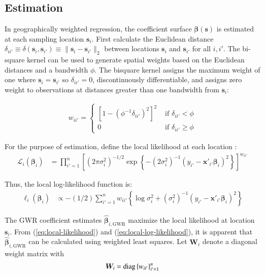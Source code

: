 \documentclass[authoryear, review, 11pt]{elsarticle}
\begin{document}
	\subsection{Estimation}		
	In geographically weighted regression, the coefficient surface $\bm{\beta}(\bm{s})$ is estimated at each sampling location $\bm{s}_i$. First calculate the Euclidean distance $\delta_{ii'} \equiv \delta\left(\bm{s}_i, \bm{s}_{i'}\right) \equiv \|\bm{s}_i  -\bm{s}_{i'}\|_2$ between locations $\bm{s}_i$ and $\bm{s}_{i'}$ for all $i, i'$. The bi-square kernel can be used to generate spatial weights based on the Euclidean distances and a bandwidth $\phi$. The bisquare kernel assigns the maximum weight of one where $\bm{s}_i = \bm{s}_{i'}$ so $\delta_{ii'}=0$, discontinuously differentiable, and assigns zero weight to observations at distances greater than one bandwidth from $\bm{s}_i$:
	
	\begin{align}\label{eq:bisquare}
		w_{ii'} = \begin{cases} \left[1-\left(\phi^{-1}\delta_{ii'}\right)^2\right]^2 &\mbox{ if } \delta_{ii'} < \phi \\ 0 &\mbox{ if } \delta_{ii'} \geq \phi \end{cases}
	\end{align}
	
	For the purpose of estimation, define the local likelihood at each location \citep{Fotheringham:2002}:
	\begin{align}\label{eq:local-likelihood}
		\mathcal{L}_i \left(\bm{\beta}_i \right) &= \prod_{i'=1}^n \left[ \left(2 \pi \sigma^2_i  \right)^{-1/2}  \exp\left\{-\left(2 \sigma^2_i\right)^{-1}  \left(y_{i'} - \bm{x}'_{i'} \bm{\beta}_i \right)^2 \right\} \right] ^ {w_{ii'}}
	\end{align}
			
	Thus, the local log-likelihood function is:
	\begin{align}\label{eq:local-log-likelihood}
		\ell_i\left(\bm{\beta}_i\right) &\propto -(1/2) \sum_{i'=1}^n w_{ii'} \left\{ \log{\sigma^2_i}  + \left(\sigma^2_i\right)^{-1}  \left(y_{i'} - \bm{x}'_{i'} \bm{\beta}_i \right)^2 \right\}
	\end{align}
	
	The GWR coefficient estimates $\hat{\bm{\beta}}_{i,\text{GWR}}$ maximize the local likelihood at location $\bm{s}_i$. From (\ref{eq:local-likelihood}) and (\ref{eq:local-log-likelihood}), it is apparent that $\hat{\bm{\beta}}_{i,\text{GWR}}$ can be calculated using weighted least squares. Let $\bm{W}_i$ denote a diagonal weight matrix with
	\begin{align}
		\bm{W}_i =  {\rm diag}\left\{w_{ii'}\right\}_{i' = 1}^n
	\end{align}
	
\end{document}
